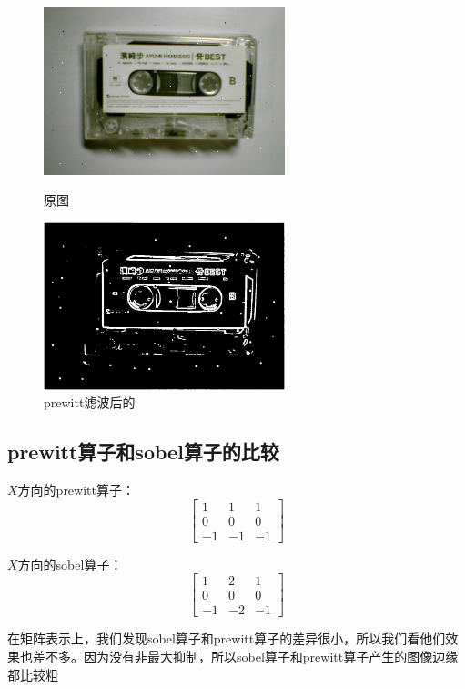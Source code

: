 \documentclass[11pt, a4paper, UTF8]{ctexart}
\begin{document}
\begin{figure}[H]
  \centering
  \begin{minipage}[t]{0.48\textwidth}
  \centering
  \includegraphics[width=7cm]{noise.jpg}
  \caption{原图}
  \end{minipage}
  \begin{minipage}[t]{0.48\textwidth}
  \centering
  \includegraphics[width=7cm]{prewitt_all_noise.png}
  \caption{prewitt滤波后的}
  \end{minipage}
\end{figure}

\subsection{prewitt算子和sobel算子的比较}

$X$方向的prewitt算子：$$
  \begin{bmatrix}
    1 & 1 & 1 \\
    0 & 0 & 0 \\
    -1 & -1 & -1 
  \end{bmatrix} $$

  $X$方向的sobel算子： $$
  \begin{bmatrix}
    1 & 2 & 1 \\
    0 & 0 & 0 \\
    -1 & -2 & -1 
  \end{bmatrix} $$

    在矩阵表示上，我们发现sobel算子和prewitt算子的差异很小，所以我们看他们效果也差不多。因为没有非最大抑制，所以sobel算子和prewitt算子产生的图像边缘都比较粗
\end{document}
